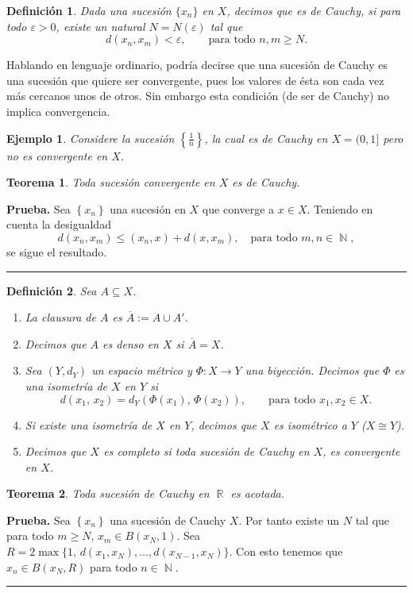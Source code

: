 \documentclass[x11names, 12pt]{book}
\newtheorem{definicion}{Definición}
\newtheorem{teorema}{Teorema}
\newtheorem{example}{Ejemplo}
\newenvironment{prueba}[1][Prueba]{\noindent\textbf{#1.} }{\ \rule{0.5em}{0.5em}}
\DeclareMathOperator{\ene}{\mathbb{N}}
\DeclareMathOperator{\R}{\mathbb{R}}
\begin{document}
\begin{definicion}
Dada una sucesión $\{x_n\}$ en $X$, decimos que es de Cauchy, si para todo $\varepsilon >0$, existe un natural $N=N(\varepsilon)$ tal que \[d(x_n, x_m) <\varepsilon, \qquad \text{para todo $n,m \geq N$}.\]
\end{definicion}
Hablando en lenguaje ordinario, podría decirse que una sucesión de Cauchy es una sucesión que quiere ser convergente, pues los valores de ésta son cada vez más cercanos unos de otros. Sin embargo esta condición (de ser de Cauchy) no implica convergencia.

\begin{example}
Considere la sucesión $\left\{ \frac{1}{n}\right\}$, la cual es de Cauchy en $X=(0,1]$ pero no es convergente en $X$.
\end{example}

\begin{teorema}
Toda sucesión convergente en $X$ es de Cauchy.
\end{teorema}
\begin{prueba}
Sea $\left\{x_n \right\}$ una sucesión en $X$ que converge a $x\in X$. Teniendo en cuenta la desigualdad
\[d(x_n, x_m)\leq (x_n, x)+d(x, x_m), \quad \text{para todo $m,n\in \ene$}, \]
se sigue el resultado.
\end{prueba}

\begin{definicion}
Sea $A\subseteq X$.
\begin{enumerate}
    \item La clausura de $A$ es $\overline{A} :=A\cup A'$.
    \item Decimos que $A$ es denso en $X$ si $\overline{A}=X$.
    \item Sea $(Y, d_Y)$ un espacio métrico  y $\Phi: X\to Y$ una biyección. Decimos que $\Phi $ es una isometría de $X$ en $Y$ si
    \[d(x_1,\, x_2)=d_Y(\Phi (x_1),\, \Phi (x_2)), \qquad \text{para todo $x_1,x_2 \in X$}.\]
    \item Si existe una isometría de $X$ en $Y$, decimos que $X$ es isométrico a $Y$ ($X\cong Y$).
    \item Decimos que $X$ es completo si toda sucesión de Cauchy en $X$, es convergente en $X$.
\end{enumerate}
\end{definicion}

\begin{teorema}\label{cauchy-acota}
Toda sucesión de Cauchy en $\R$ es acotada.
\end{teorema}
\begin{prueba}
Sea $\left\{x_n \right\}$ una sucesión de Cauchy $X$. Por tanto existe un $N$ tal que para todo $m\geq N$, $x_m\in B(x_N, 1).$ Sea $R=2\max\{1, \, d(x_1, x_N),\dots, d(x_{N-1}, x_N)\}.$ Con esto tenemos que $x_n \in B(x_N, R)$ para todo $n\in \ene .$
\end{prueba}
\end{document}
